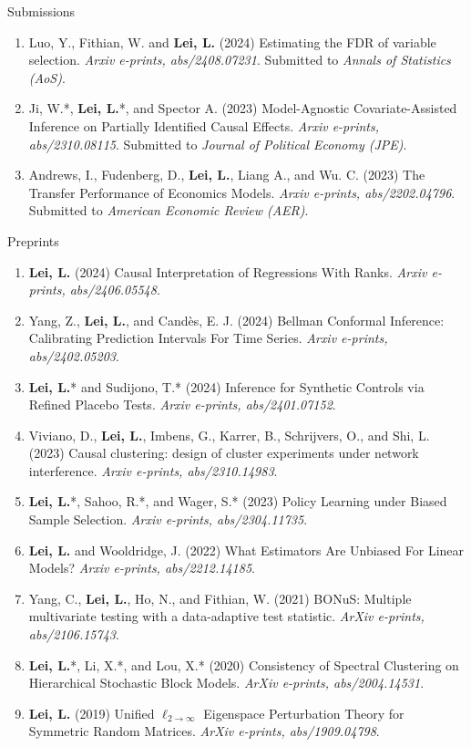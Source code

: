 \documentclass{article}
\newcommand{\red}[1]{{\color{red} #1}}
\begin{document}
\begin{large}
\noindent Submissions
\end{large}

\begin{enumerate}
\item \red{Luo, Y., Fithian, W. and \textbf{Lei, L.} (2024) Estimating the FDR of variable selection. \emph{Arxiv e-prints, abs/2408.07231}. Submitted to \emph{Annals of Statistics (AoS)}.}
\item \red{Ji, W.*, \textbf{Lei, L.}*, and Spector A. (2023) Model-Agnostic Covariate-Assisted Inference on Partially Identified Causal Effects. \emph{Arxiv e-prints, abs/2310.08115}. Submitted to \emph{Journal of Political Economy (JPE)}.}
\item \red{Andrews, I., Fudenberg, D., \textbf{Lei, L.}, Liang A., and Wu. C. (2023) The Transfer Performance of Economics Models. \emph{Arxiv e-prints, abs/2202.04796}. Submitted to \emph{American Economic Review (AER)}.}
\end{enumerate}

\begin{large}
\noindent Preprints
\end{large}
\begin{enumerate}
\item \red{\textbf{Lei, L.} (2024) Causal Interpretation of Regressions With Ranks. \emph{Arxiv e-prints, abs/2406.05548}.}
\item \red{Yang, Z., \textbf{Lei, L.}, and Cand\`{e}s, E. J. (2024) Bellman Conformal Inference: Calibrating Prediction Intervals For Time Series. \emph{Arxiv e-prints, abs/2402.05203}.}
\item \red{\textbf{Lei, L.}* and Sudijono, T.* (2024) Inference for Synthetic Controls via Refined Placebo Tests. \emph{Arxiv e-prints, abs/2401.07152}.}
\item Viviano, D., \textbf{Lei, L.}, Imbens, G., Karrer, B., Schrijvers, O., and Shi, L. (2023) Causal clustering: design of cluster experiments under network interference. \emph{Arxiv e-prints, abs/2310.14983}.
\item \textbf{Lei, L.}*, Sahoo, R.*, and Wager, S.* (2023) Policy Learning under Biased Sample Selection. \emph{Arxiv e-prints, abs/2304.11735}.  
\item \textbf{Lei, L.} and Wooldridge, J. (2022) What Estimators Are Unbiased For Linear Models? \emph{Arxiv e-prints, abs/2212.14185}.
\item Yang, C., \textbf{Lei, L.}, Ho, N., and Fithian, W. (2021) BONuS: Multiple multivariate testing with a data-adaptive test statistic. \emph{ArXiv e-prints, abs/2106.15743}.
\item \textbf{Lei, L.}*, Li, X.*, and Lou, X.* (2020) Consistency of Spectral Clustering on Hierarchical Stochastic Block Models. \emph{ArXiv e-prints, abs/2004.14531}.
\item \textbf{Lei, L.} (2019) Unified $\ell_{2\rightarrow\infty}$ Eigenspace Perturbation Theory for Symmetric Random Matrices. \emph{ArXiv e-prints, abs/1909.04798}.
\end{enumerate}
\end{document}
